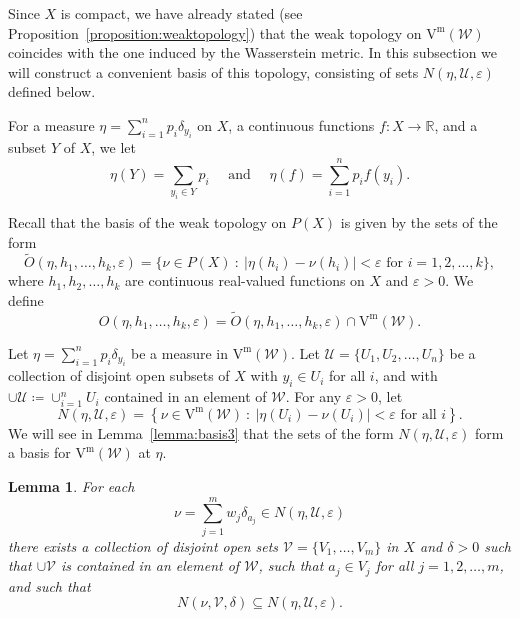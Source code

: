 \documentclass[11pt, reqno, english]{amsart}
\theoremstyle{plain}
\newtheorem{lemma}{Lemma}[section]
\theoremstyle{definition}
\theoremstyle{myremark}
\newcommand{\cU}{\mathcal{U}}
\newcommand{\cV}{\mathcal{V}}
\newcommand{\cW}{\mathcal{W}}
\newcommand{\vietm}[1]{\mathrm{V}^\mathrm{m}(#1)}
\newcommand{\vrm}[2]{\mathrm{VR}^\mathrm{m}(#1;#2)}
\begin{document}
Since $X$ is compact, we have already stated (see Proposition~\ref{proposition:weaktopology}) that the weak topology on $\vietm{\cW}$ coincides with the one induced by the Wasserstein metric.
In this subsection we will construct a convenient basis of this topology, consisting of sets $N(\eta,\cU,\varepsilon)$ defined below.

For a measure $\eta = \sum_{i=1}^n p_i \delta_{y_i}$ on $X$, a continuous functions $f\colon X\to \mathbb R$, and a subset $Y$ of $X$, we let
\[\eta(Y) = \sum_{y_i\in Y} p_i
\quad\mbox{ and }\quad
\eta(f) = \sum_{i=1}^n p_i f(y_i).\]

Recall that the basis of the weak topology on $P(X)$ is given by the sets of the form 
\[\widetilde{O}(\eta, h_1,\dots ,h_k, \varepsilon) =\{\nu \in P(X)~:~ |\eta(h_i)- \nu(h_i)|<\varepsilon \text{ for } i=1,2,\dots, k\},\]
where $h_1, h_2, \dots ,h_k$ are continuous real-valued functions on $X$ and $\varepsilon >0$.
We define
\[O(\eta, h_1,\dots ,h_k, \varepsilon) %
= \widetilde{O}(\eta, h_1,\dots ,h_k, \varepsilon) \cap \vietm{\cW}.\]

Let $\eta = \sum_{i=1}^n p_i \delta_{y_i}$ be a measure in $\vietm{\cW}$.
Let $\cU=\{U_1, U_2, \dots, U_n\}$ be a collection of disjoint open subsets of $X$ with $y_i\in U_i$ for all $i$, and with $\cup\cU \coloneqq \cup_{i=1}^n U_i$ contained in an element of $\cW$.
For any $\varepsilon >0$, let
\[N(\eta,\cU,\varepsilon) =\left\{\nu \in \vietm{\cW}~:~|\eta(U_i)-\nu(U_i)|<\varepsilon \text{ for all }i\right\}.\]
We will see in Lemma~\ref{lemma:basis3} that the sets of the form $N(\eta,\cU,\varepsilon)$ form a basis for $\vietm{\cW}$ at $\eta$.

\begin{lemma}
\label{lemma:basis1} For each 
\[\nu  =\sum_{j=1}^m w_j \delta_{a_j}\in N(\eta,\cU,\varepsilon)\]
there exists a collection of disjoint open sets $\cV=\{V_1,\dots, V_m\}$ in $X$ and $\delta >0$ such that $\cup\cV$ is contained in an element of $\cW$, such that $a_j\in V_j$ for all $j=1,2,\dots,m$, and such that
\[N(\nu,\cV,\delta)\subseteq N(\eta,\cU,\varepsilon).\]
\end{lemma}
\end{document}
